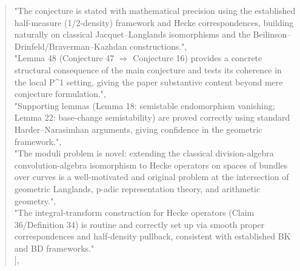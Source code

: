 \documentclass[11pt]{article}
\begin{document}
\begin{quote}
    "The conjecture is stated with mathematical precision using the established half-measure (1/2-density) framework and Hecke correspondences, building naturally on classical Jacquet--Langlands isomorphisms and the Beilinson--Drinfeld/Braverman--Kazhdan constructions.",\\
    "Lemma 48 (Conjecture 47 \ensuremath{\Rightarrow} Conjecture 16) provides a concrete structural consequence of the main conjecture and tests its coherence in the local P\^{}1 setting, giving the paper substantive content beyond mere conjecture formulation.",\\
    "Supporting lemmas (Lemma 18: semistable endomorphism vanishing; Lemma 22: base-change semistability) are proved correctly using standard Harder--Narasimhan arguments, giving confidence in the geometric framework.",\\
    "The moduli problem is novel: extending the classical division-algebra convolution-algebra isomorphism to Hecke operators on spaces of bundles over curves is a well-motivated and original problem at the intersection of geometric Langlands, p-adic representation theory, and arithmetic geometry.",\\
    "The integral-transform construction for Hecke operators (Claim 36/Definition 34) is routine and correctly set up via smooth proper correspondences and half-density pullback, consistent with established BK and BD frameworks."\\
  ],\\

\end{quote}
\end{document}
